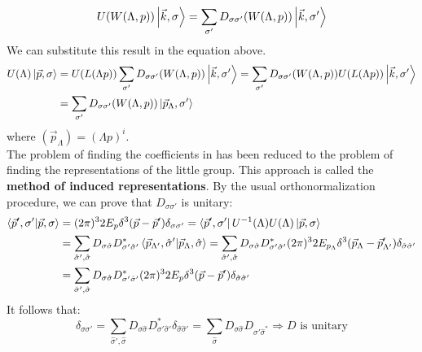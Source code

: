 \documentclass[../main.tex]{subfiles}
\begin{document}
\[
U(W(\Lambda,p))\ket{\vec{k},\sigma}=\sum_{\sigma'}D_{\sigma\sigma'}(W(\Lambda,p))\ket{\vec{k},\sigma'}
\]
We can substitute this result in the equation above.
\begin{align*}
U(\Lambda)\ket{\vec{p},\sigma}&=U(L(\Lambda p))\sum_{\sigma'}D_{\sigma\sigma'}(W(\Lambda,p))\ket{\vec{k},\sigma'}=\sum_{\sigma'}D_{\sigma\sigma'}(W(\Lambda,p))U(L(\Lambda p))\ket{\vec{k},\sigma'}\\
&=\sum_{\sigma'}D_{\sigma\sigma'}(W(\Lambda,p))\ket{\vec{p}_\Lambda,\sigma'}
\end{align*}
where $(\vec{p}_\Lambda)=(\Lambda p)^i$.\\
The problem of finding the coefficients in  has been reduced to the problem of finding the representations of the little group. This approach is called the \textbf{method of induced representations}.
By the usual orthonormalization procedure, we can prove that $D_{\sigma\sigma'}$ is unitary:
\begin{align*}
\bra{\vec{p}',\sigma'}\ket{\vec{p},\sigma}&=(2\pi)^32E_p\delta^3(\vec{p}-\vec{p}')\delta_{\sigma\sigma'}=\bra{\vec{p}',\sigma'}U^{-1}(\Lambda)U(\Lambda)\ket{\vec{p},\sigma}\\
&=\sum_{\hat{\sigma}',\hat{\sigma}}D_{\sigma\hat{\sigma}}D_{\sigma'\hat{\sigma}'}^*\bra{\vec{p}_{\Lambda'},\hat{\sigma}'}\ket{\vec{p}_\Lambda,\hat{\sigma}}=\sum_{\hat{\sigma}',\hat{\sigma}}D_{\sigma\hat{\sigma}}D_{\sigma'\hat{\sigma}'}^*(2\pi)^32E_{p_{\Lambda}}\delta^3(\vec{p}_\Lambda-\vec{p}'_{\Lambda'})\delta_{\hat{\sigma}\hat{\sigma}'}\\
&=\sum_{\hat{\sigma}',\hat{\sigma}}D_{\sigma\hat{\sigma}}D_{\sigma'\hat{\sigma}'}^*(2\pi)^32E_p\delta^3(\vec{p}-\vec{p}')\delta_{\hat{\sigma}\hat{\sigma}'}
\end{align*}
It follows that:
\[
\delta_{\sigma\sigma'}=\sum_{\hat{\sigma}',\hat{\sigma}}D_{\sigma\hat{\sigma}}D_{\sigma'\hat{\sigma}'}^*\delta_{\hat{\sigma}\hat{\sigma}'}=\sum_{\hat{\sigma}}D_{\sigma\hat{\sigma}}D_{\sigma'\hat{\sigma}^*}\Rightarrow\text{$D$ is unitary}
\]
\end{document}
